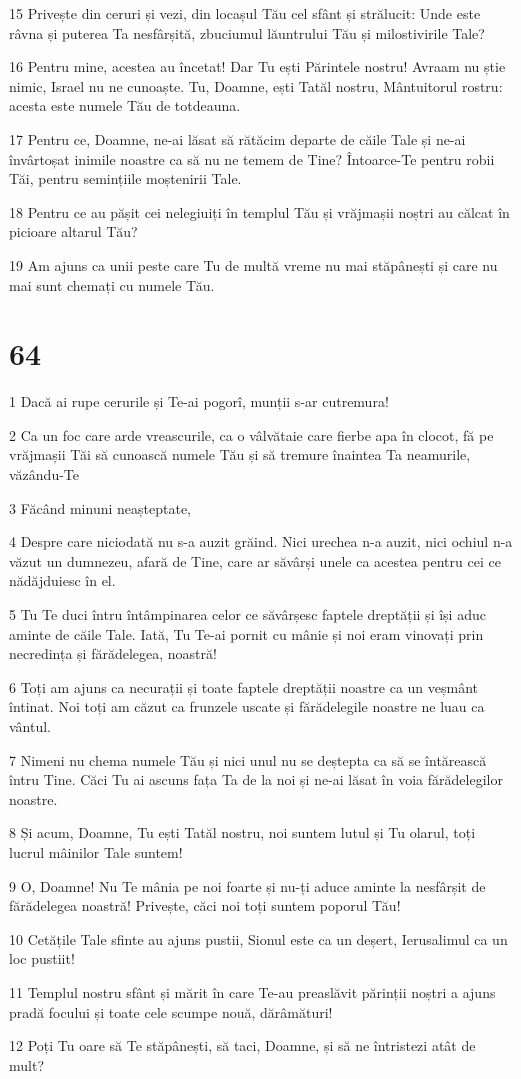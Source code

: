 \par 15 Privește din ceruri și vezi, din locașul Tău cel sfânt și strălucit: Unde este râvna și puterea Ta nesfârșită, zbuciumul lăuntrului Tău și milostivirile Tale?
\par 16 Pentru mine, acestea au încetat! Dar Tu ești Părintele nostru! Avraam nu știe nimic, Israel nu ne cunoaște. Tu, Doamne, ești Tatăl nostru, Mântuitorul rostru: acesta este numele Tău de totdeauna.
\par 17 Pentru ce, Doamne, ne-ai lăsat să rătăcim departe de căile Tale și ne-ai învârtoșat inimile noastre ca să nu ne temem de Tine? Întoarce-Te pentru robii Tăi, pentru semințiile moștenirii Tale.
\par 18 Pentru ce au pășit cei nelegiuiți în templul Tău și vrăjmașii noștri au călcat în picioare altarul Tău?
\par 19 Am ajuns ca unii peste care Tu de multă vreme nu mai stăpânești și care nu mai sunt chemați cu numele Tău.

\chapter{64}

\par 1 Dacă ai rupe cerurile și Te-ai pogorî, munții s-ar cutremura!
\par 2 Ca un foc care arde vreascurile, ca o vâlvătaie care fierbe apa în clocot, fă pe vrăjmașii Tăi să cunoască numele Tău și să tremure înaintea Ta neamurile, văzându-Te
\par 3 Făcând minuni neașteptate,
\par 4 Despre care niciodată nu s-a auzit grăind. Nici urechea n-a auzit, nici ochiul n-a văzut un dumnezeu, afară de Tine, care ar săvârși unele ca acestea pentru cei ce nădăjduiesc în el.
\par 5 Tu Te duci întru întâmpinarea celor ce săvârșesc faptele dreptății și își aduc aminte de căile Tale. Iată, Tu Te-ai pornit cu mânie și noi eram vinovați prin necredința și fărădelegea, noastră!
\par 6 Toți am ajuns ca necurații și toate faptele dreptății noastre ca un veșmânt întinat. Noi toți am căzut ca frunzele uscate și fărădelegile noastre ne luau ca vântul.
\par 7 Nimeni nu chema numele Tău și nici unul nu se deștepta ca să se întărească întru Tine. Căci Tu ai ascuns fața Ta de la noi și ne-ai lăsat în voia fărădelegilor noastre.
\par 8 Și acum, Doamne, Tu ești Tatăl nostru, noi suntem lutul și Tu olarul, toți lucrul mâinilor Tale suntem!
\par 9 O, Doamne! Nu Te mânia pe noi foarte și nu-ți aduce aminte la nesfârșit de fărădelegea noastră! Privește, căci noi toți suntem poporul Tău!
\par 10 Cetățile Tale sfinte au ajuns pustii, Sionul este ca un deșert, Ierusalimul ca un loc pustiit!
\par 11 Templul nostru sfânt și mărit în care Te-au preaslăvit părinții noștri a ajuns pradă focului și toate cele scumpe nouă, dărâmături!
\par 12 Poți Tu oare să Te stăpânești, să taci, Doamne, și să ne întristezi atât de mult?


